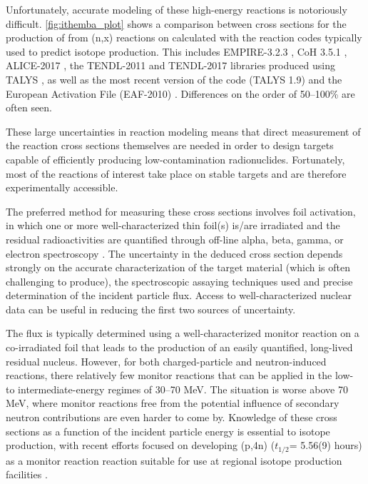 \documentclass[letterpaper]{ar-1col}
\begin{document}
Unfortunately, accurate modeling of these high-energy reactions is notoriously difficult.
 \autoref{fig:ithemba_plot} shows a comparison between cross sections for the production of  from (n,x) reactions on  calculated with the reaction codes typically used to predict isotope production.
 This includes EMPIRE-3.2.3 \cite{Herman2013}, CoH 3.5.1 \cite{KAWANO2010}, ALICE-2017 \cite{Blann1996}, the TENDL-2011 and TENDL-2017 libraries produced using TALYS \cite{Rochman2017}, as well as the most recent version of the code (TALYS 1.9) \cite{Koning2012} and the European Activation File (EAF-2010) \cite{Forrest2005}.
 Differences on the order of 50--100\% are often seen.
 

These large uncertainties in reaction modeling means that direct measurement of the reaction cross sections themselves are needed in order to design targets capable of efficiently producing low-contamination radionuclides.
 Fortunately, most of the reactions of interest take place on stable targets and are therefore experimentally accessible.


The preferred method for measuring these cross sections involves foil activation, in which one or more well-characterized thin foil(s) is/are irradiated and the residual radioactivities are quantified through off-line alpha, beta, gamma, or electron spectroscopy \cite{Voyles2018a,Graves2016}.
 The uncertainty in the deduced cross section depends strongly on the accurate characterization of the target material (which is often challenging to produce), the spectroscopic assaying techniques used and precise determination of the incident particle flux.
Access to well-characterized nuclear data can be useful in reducing the first two sources of uncertainty.



The flux is typically determined using a well-characterized monitor reaction on a co-irradiated foil that leads to the production of an easily quantified, long-lived residual nucleus.
However, for both charged-particle and neutron-induced reactions, there relatively few monitor reactions that can be applied in the low- to intermediate-energy regimes of 30--70 MeV.
 The situation is worse above 70 MeV, where monitor reactions  free from the potential influence of secondary neutron contributions are even harder to come by.
 Knowledge of these cross sections as a function of the incident particle energy is essential to  isotope production, with recent efforts focused on developing  (p,4n) ($t_{1/2}$= 5.56(9) hours) as a monitor reaction reaction suitable for use at regional isotope production facilities \cite{Voyles2018a, Kim2018}.
 
\end{document}
